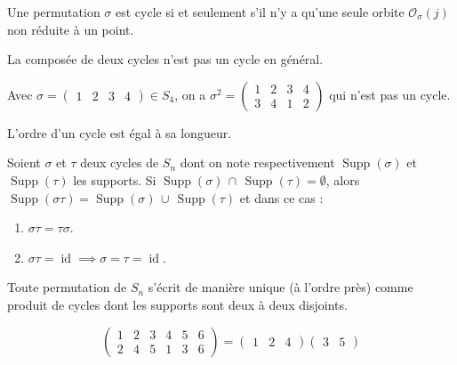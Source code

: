 
  \begin{proposition}
    Une permutation $\sigma$ est cycle si et seulement s'il n'y a qu'une seule orbite $\mathcal{O}_\sigma(j)$ non réduite à un point.
  \end{proposition}

  \begin{remark}
    La composée de deux cycles n'est pas un cycle en général.
  \end{remark}

  \begin{example}
    Avec $\sigma = \begin{pmatrix} 1 & 2 & 3 & 4 \end{pmatrix} \in S_4$, on a $\sigma^2 = \begin{pmatrix} 1 & 2 & 3 & 4 \\ 3 & 4 & 1 & 2 \end{pmatrix}$ qui n'est pas un cycle.
  \end{example}

  \begin{proposition}
    L'ordre d'un cycle est égal à sa longueur.
  \end{proposition}


  \begin{proposition}
    Soient $\sigma$ et $\tau$ deux cycles de $S_n$ dont on note respectivement $\operatorname{Supp}(\sigma)$ et $\operatorname{Supp}(\tau)$ les supports. Si $\operatorname{Supp}(\sigma) \, \cap \, \operatorname{Supp}(\tau) = \emptyset$, alors $\operatorname{Supp}(\sigma\tau) = \operatorname{Supp}(\sigma) \, \cup \, \operatorname{Supp}(\tau)$ et dans ce cas :
    \begin{enumerate}[label={\bfseries(\roman*)}]
      \item $\sigma\tau = \tau\sigma$.
      \item $\sigma\tau = \operatorname{id} \implies \sigma = \tau = \operatorname{id}$.
    \end{enumerate}
  \end{proposition}

  \begin{theorem}
    Toute permutation de $S_n$ s'écrit de manière unique (à l'ordre près) comme produit de cycles dont les supports sont deux à deux disjoints.
  \end{theorem}

  \begin{example}
    \label{105-1}
    \[
    \begin{pmatrix}
      1 & 2 & 3 & 4 & 5 & 6 \\
      2 & 4 & 5 & 1 & 3 & 6
    \end{pmatrix}
    =
    \begin{pmatrix} 1 & 2 & 4 \end{pmatrix}\begin{pmatrix} 3 & 5 \end{pmatrix}
    \]
  \end{example}

